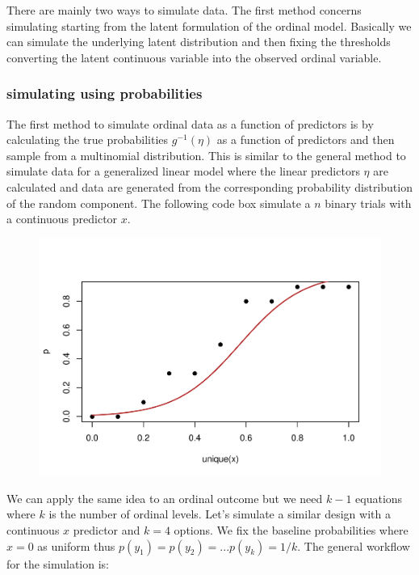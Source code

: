 \documentclass[
  man,floatsintext]{apa6}
\begin{document}
There are mainly two ways to simulate data. The first method concerns simulating starting from the latent formulation of the ordinal model. Basically we can simulate the underlying latent distribution and then fixing the thresholds converting the latent continuous variable into the observed ordinal variable.

\subsubsection{simulating using probabilities}\label{simulating-using-probabilities}

The first method to simulate ordinal data as a function of predictors is by calculating the true probabilities \(g^{-1}(\eta)\) as a function of predictors and then sample from a multinomial distribution. This is similar to the general method to simulate data for a generalized linear model where the linear predictors \(\eta\) are calculated and data are generated from the corresponding probability distribution of the random component. The following code box simulate a \(n\) binary trials with a continuous predictor \(x\).

\scriptsize

\begin{figure}

{\centering \includegraphics{paper-new_files/figure-latex/unnamed-chunk-9-1} 

}

\caption{ }\label{fig:unnamed-chunk-9}
\end{figure}

\normalsize

We can apply the same idea to an ordinal outcome but we need \(k - 1\) equations where \(k\) is the number of ordinal levels. Let's simulate a similar design with a continuous \(x\) predictor and \(k = 4\) options. We fix the baseline probabilities where \(x = 0\) as uniform thus \(p(y_1) = p(y_2) = ... p(y_k) = 1/k\). The general workflow for the simulation is:
\end{document}

